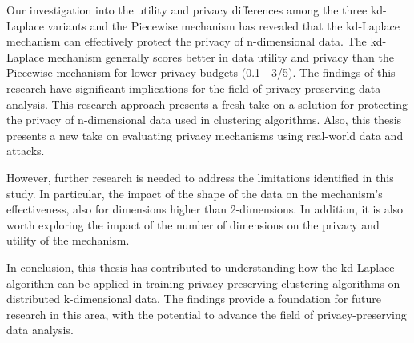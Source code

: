
Our investigation into the utility and privacy differences among the three kd-Laplace variants and the Piecewise mechanism has revealed that the kd-Laplace mechanism can effectively protect the privacy of n-dimensional data.
The kd-Laplace mechanism generally scores better in data utility and privacy than the Piecewise mechanism for lower privacy budgets (0.1 - 3/5).
The findings of this research have significant implications for the field of privacy-preserving data analysis.
This research approach presents a fresh take on a solution for protecting the privacy of n-dimensional data used in clustering algorithms.
Also, this thesis presents a new take on evaluating privacy mechanisms using real-world data and attacks.

However, further research is needed to address the limitations identified in this study.
In particular, the impact of the shape of the data on the mechanism's effectiveness, also for dimensions higher than 2-dimensions.
In addition, it is also worth exploring the impact of the number of dimensions on the privacy and utility of the mechanism.

In conclusion, this thesis has contributed to understanding how the kd-Laplace algorithm can be applied in training privacy-preserving clustering algorithms on distributed k-dimensional data.
The findings provide a foundation for future research in this area, with the potential to advance the field of privacy-preserving data analysis.




